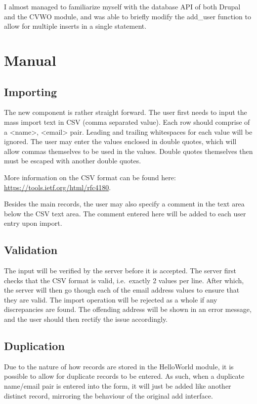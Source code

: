 \documentclass[12pt]{article}
\begin{document}
I almost managed to familiarize myself with the database API of both Drupal and the CVWO module, and was able to briefly modify the add\_user function to allow for multiple inserts in a single statement.

\section*{Manual}

\subsection*{Importing}

The new component is rather straight forward. The user first needs to input the mass import text in CSV (comma separated value). Each row should comprise of a <name>, <email> pair. Leading and trailing whitespaces for each value will be ignored. The user may enter the values enclosed in double quotes, which will allow commas themselves to be used in the values. Double quotes themselves then must be escaped with another double quotes.

More information on the CSV format can be found here: \url{https://tools.ietf.org/html/rfc4180}.

Besides the main records, the user may also specify a comment in the text area below the CSV text area. The comment entered here will be added to each user entry upon import.

\subsection*{Validation}

The input will be verified by the server before it is accepted. The server first checks that the CSV format is valid, i.e.\ exactly 2 values per line. After which, the server will then go though each of the email address values to ensure that they are valid. The import operation will be rejected as a whole if any discrepancies are found. The offending address will be shown in an error message, and the user should then rectify the issue accordingly.

\subsection*{Duplication}

Due to the nature of how records are stored in the HelloWorld module, it is possible to allow for duplicate records to be entered. As such, when a duplicate name/email pair is entered into the form, it will just be added like another distinct record, mirroring the behaviour of the original add interface.
\end{document}

